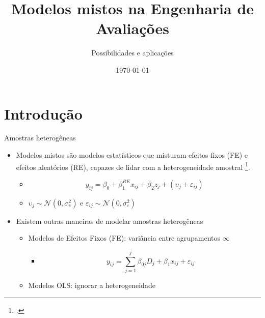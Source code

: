 \documentclass[9pt,ignorenonframetext,aspectratio=169]{beamer}
\title[]{Modelos mistos na Engenharia de Avaliações}
\subtitle{Possibilidades e aplicações}
\author[
        Luiz Fernando Palin Droubi\footnote<.->{\href{mailto:lfpdroubi@gmail.com}{\nolinkurl{lfpdroubi@gmail.com}}}
\newline \and Carlos Augusto Zilli\footnote<.->{\href{mailto:carlos.zilli@ifsc.edu.br}{\nolinkurl{carlos.zilli@ifsc.edu.br}}}
\newline \and Norberto Hochheim\footnote<.->{\href{mailto:norberto.hochheim@ufsc.br}{\nolinkurl{norberto.hochheim@ufsc.br}}}
    ]{Luiz Fernando Palin Droubi\footnote<.->{\href{mailto:lfpdroubi@gmail.com}{\nolinkurl{lfpdroubi@gmail.com}}}
\newline \and Carlos Augusto Zilli\footnote<.->{\href{mailto:carlos.zilli@ifsc.edu.br}{\nolinkurl{carlos.zilli@ifsc.edu.br}}}
\newline \and Norberto Hochheim\footnote<.->{\href{mailto:norberto.hochheim@ufsc.br}{\nolinkurl{norberto.hochheim@ufsc.br}}}}
\institute[
    ]{
    GEAP - UFSC
    }
\date[
      \today
  ]{
      \today
        }
\providecommand{\tightlist}{%
  \setlength{\itemsep}{0pt}\setlength{\parskip}{0pt}}
\begin{document}
  \begin{frame}[plain]
  \titlepage
  \end{frame}


  \begin{frame}
  \tableofcontents[hideallsubsections]
  \end{frame}

\hypertarget{introduuxe7uxe3o}{%
\section{Introdução}\label{introduuxe7uxe3o}}

\begin{frame}{Amostras heterogêneas}
\protect\hypertarget{amostras-heteroguxeaneas}{}

\begin{itemize}[<+->]
\tightlist
\item
  \alert<1>{Modelos mistos são modelos estatísticos que misturam efeitos fixos 
  (FE) e efeitos aleatórios (RE), capazes de lidar com a heterogeneidade amostral 
  \footcite{bell2019}.}

  \begin{itemize}[<+->]
  \tightlist
  \item
    \alert<2>{\begin{equation}
    y_{ij} = \beta_0 + \beta_1^{RE} x_{ij} + \beta_2 z_j + (\upsilon_j + \varepsilon_{ij})
    \end{equation}}
  \item
    \alert<3>{$\upsilon_j \sim \mathcal N(0, \sigma^2_{\upsilon})$ e 
    $\varepsilon_{ij} \sim \mathcal N(0, \sigma^2_{\varepsilon})$}
  \end{itemize}
\end{itemize}

\begin{itemize}[<+->]
\tightlist
\item
  \alert<4>{Existem outras maneiras de modelar amostras heterogêneas}

  \begin{itemize}[<+->]
  \tightlist
  \item
    \alert<5>{Modelos de Efeitos Fixos (FE): variância entre agrupamentos $\infty$}

    \begin{itemize}[<+->]
    \tightlist
    \item
      \alert<6>{\begin{equation}
      y_{ij} = \sum_{j=1}^{j}\beta_{0j}D_j + \beta_1 x_{ij} + \varepsilon_{ij}
      \end{equation}}
    \end{itemize}
  \item
    \alert<7>{Modelos OLS: ignorar a heterogeneidade}


\end{itemize}
\end{itemize}
\end{frame}
\end{document}

